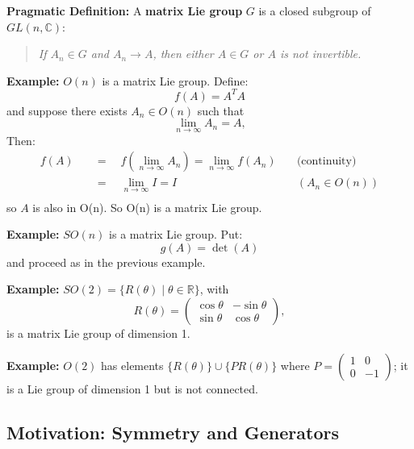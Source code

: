 \documentclass[12pt]{article}
\begin{document}
\begin{center}
\end{center}

\noindent\textbf{Pragmatic Definition:} A \textbf{matrix Lie group} $G$ is a
closed subgroup of $GL(n, \mathbb{C})$:
\begin{quote}
  \textit{If $A_n \in G$ and $A_n \to A$, then either $A \in G$ or $A$ is
  not invertible.}
\end{quote}

\noindent
\textbf{Example:} $O(n)$ is a matrix Lie group.  Define:
$$f(A) = A^T A$$
and suppose there exists ${A_n \in O(n)}$ such that
$$\lim_{n\to\infty} A_n = A,$$
Then:
\begin{align}
  f(A) \quad &= \quad f(\lim_{n\to\infty} A_n) = \lim_{n\to\infty} f(A_n)  \quad & \text{(continuity)} \\
  &= \quad \lim_{n\to\infty} I = I  \quad & (A_n \in O(n)) \\
\end{align} 
so $A$ is also in O(n).  So O(n) is a matrix Lie group.

\noindent
\textbf{Example:} $SO(n)$ is a matrix Lie group.  Put:
$$g(A) = \det(A)$$
and proceed as in the previous example.

\noindent
\textbf{Example:} $SO(2) = \{R(\theta) \mid \theta \in \mathbb{R}\}$, with
\begin{equation*}
      R(\theta) = \begin{pmatrix}\cos\theta & -\sin\theta \\ \sin\theta & \cos\theta\end{pmatrix},
    \end{equation*}
is a matrix Lie group of dimension 1.

\noindent
\textbf{Example:} $O(2)$ has elements $\{R(\theta)\} \cup \{PR(\theta)\}$ where $P =
    \begin{pmatrix}1&0\\0&-1\end{pmatrix}$; it is a Lie group of dimension 1
    but is not connected.

\subsection*{Motivation:  Symmetry and Generators}
\end{document}
